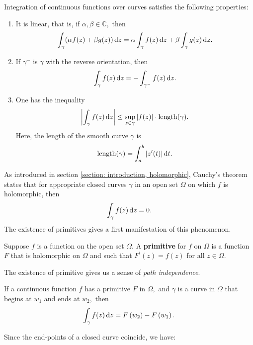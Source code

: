 \documentclass{chapter}
\begin{document}
            \begin{proposition}
                Integration of continuous functions over curves satisfies the following properties:
                \begin{enumerate}
                    \item It is linear, that is, if $\alpha, \beta \in \mathbb{C},$ then \[\int_{\gamma}(\alpha f(z)+\beta g(z)) \mathop{}\!\mathrm{d} z=\alpha \int_{\gamma} f(z) \mathop{}\!\mathrm{d} z+\beta \int_{\gamma} g(z) \mathop{}\!\mathrm{d} z.\]
                    \item If $\gamma^{-}$ is $\gamma$ with the reverse orientation, then \[\int_{\gamma} f(z) \mathop{}\!\mathrm{d} z=-\int_{\gamma^{-}} f(z) \mathop{}\!\mathrm{d} z.\]
                    \item One has the inequality \[\left|\int_{\gamma} f(z) \mathop{}\!\mathrm{d} z\right| \leq \sup _{z \in \gamma}|f(z)| \cdot \operatorname{length}(\gamma).\] Here, the length of the smooth curve $\gamma$ is \[\operatorname{length}(\gamma)=\int_{a}^{b}\left|z^{\prime}(t)\right| \mathop{}\!\mathrm{d} t.\]
                \end{enumerate}
            \end{proposition}

            \bigskip
            As introduced in section \ref{section: introduction, holomorphic}, Cauchy's theorem states that for appropriate closed curves $\gamma$ in an open set $\Omega$ on which $f$ is holomorphic, then \[\int_{\gamma} f(z) \mathop{}\!\mathrm{d} z=0.\] The existence of primitives gives a first manifestation of this phenomenon.

            \begin{definition}[primitive]
                Suppose $f$ is a function on the open set $\Omega .$ A \textbf{primitive} for $f$ on $\Omega$ is a function $F$ that is holomorphic on $\Omega$ and such that $F^{\prime}(z)=f(z)$ for all $z \in \Omega$.
            \end{definition}

            The existence of primitive gives us a sense of \emph{path independence}.

            \begin{theorem}
                If a continuous function $f$ has a primitive $F$ in $\Omega,$ and $\gamma$ is a curve in $\Omega$ that begins at $w_{1}$ and ends at $w_{2},$ then \[\int_{\gamma} f(z) \mathop{}\!\mathrm{d} z=F\left(w_{2}\right)-F\left(w_{1}\right).\]
            \end{theorem}

            Since the end-points of a closed curve coincide, we have:
\end{document}
